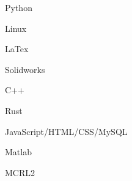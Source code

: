 \vspace{0.4cm}
\begin{cSection}{\textwidth}{0.47\textwidth}{0.48\textwidth}
{%
\begin{cSubsection}{}
  \begin{experienceItem} {}{Python}{}{} \end{experienceItem}
  \begin{experienceItem} {\hphantom{}}{Linux}{}{} \end{experienceItem}
  \begin{experienceItem} {\hphantom{}}{LaTex}{}{} \end{experienceItem}
  \begin{experienceItem} {\hphantom{}}{Solidworks}{}{} \end{experienceItem}

  \begin{experienceItem} {}{C++}{}{} \end{experienceItem}
  \begin{experienceItem} {\hphantom{}}{Rust}{}{} \end{experienceItem}
  \begin{experienceItem} {\hphantom{}}{JavaScript/HTML/CSS/MySQL}{}{} \end{experienceItem}
  \begin{experienceItem} {\hphantom{}}{Matlab}{}{} \end{experienceItem}
  \begin{experienceItem} {\hphantom{}}{MCRL2}{}{} \end{experienceItem}
\end{cSubsection}

}
\end{cSection}

